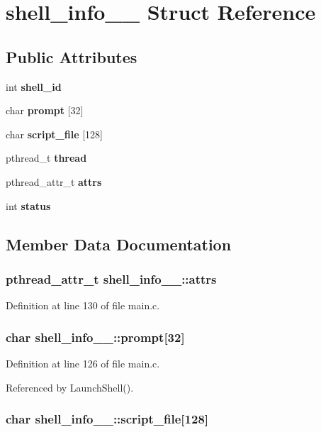 \section{shell\_\-info\_\-\_\- Struct Reference}
\label{structshell__info____}
\subsection*{Public Attributes}
\begin{CompactItemize}
\item 
int {\bf shell\_\-id}
\item 
char {\bf prompt} [32]
\item 
char {\bf script\_\-file} [128]
\item 
pthread\_\-t {\bf thread}
\item 
pthread\_\-attr\_\-t {\bf attrs}
\item 
int {\bf status}
\end{CompactItemize}


\subsection{Member Data Documentation}
\subsubsection{\setlength{\rightskip}{0pt plus 5cm}pthread\_\-attr\_\-t {\bf shell\_\-info\_\-\_\-::attrs}}\label{structshell__info_____o4}




Definition at line 130 of file main.c.
\subsubsection{\setlength{\rightskip}{0pt plus 5cm}char {\bf shell\_\-info\_\-\_\-::prompt}[32]}\label{structshell__info_____o1}




Definition at line 126 of file main.c.

Referenced by Launch\-Shell().
\subsubsection{\setlength{\rightskip}{0pt plus 5cm}char {\bf shell\_\-info\_\-\_\-::script\_\-file}[128]}\label{structshell__info_____o2}





